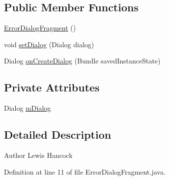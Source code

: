 \subsection*{Public Member Functions}
\begin{DoxyCompactItemize}
\item 
\hyperlink{classuk_1_1ac_1_1swan_1_1digitaltrails_1_1fragments_1_1_error_dialog_fragment_a6aa4b80715bc00801a6501d7ef1bdd25}{Error\+Dialog\+Fragment} ()
\item 
void \hyperlink{classuk_1_1ac_1_1swan_1_1digitaltrails_1_1fragments_1_1_error_dialog_fragment_a7cd569b3da82fc2436a5a8aed72ebbb0}{set\+Dialog} (Dialog dialog)
\item 
Dialog \hyperlink{classuk_1_1ac_1_1swan_1_1digitaltrails_1_1fragments_1_1_error_dialog_fragment_ae61e24771f631f723e29b38cd1a6fc84}{on\+Create\+Dialog} (Bundle saved\+Instance\+State)
\end{DoxyCompactItemize}
\subsection*{Private Attributes}
\begin{DoxyCompactItemize}
\item 
Dialog \hyperlink{classuk_1_1ac_1_1swan_1_1digitaltrails_1_1fragments_1_1_error_dialog_fragment_a5ed26e8b3c12f4b2368128f87928c4d8}{m\+Dialog}
\end{DoxyCompactItemize}


\subsection{Detailed Description}
\begin{DoxyAuthor}{Author}
Lewis Hancock 
\end{DoxyAuthor}


Definition at line 11 of file Error\+Dialog\+Fragment.\+java.



